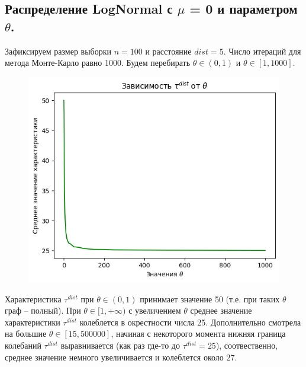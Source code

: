 \documentclass{report}
\begin{document}
\subsection{Распределение LogNormal с $\mu$ = 0 и параметром $\theta$.}
Зафиксируем размер выборки $n = 100$ и расстояние $dist = 5$. Число итераций для метода Монте-Карло равно 1000.
\newline
\newline
Будем перебирать $\theta \in (0, 1)$ и $\theta \in [1, 1000]$.
\newline
\newline
\begin{figure}[h]
    \centering
    \includegraphics[width=0.5\linewidth]{6.png}
\end{figure}
\newline
\newline
Характеристика $\tau^{dist}$ при $\theta \in (0, 1)$ принимает значение 50 (т.е. при таких $\theta$ граф -- полный). 
\newline
\newline
При $\theta \in [1, +\infty)$ с увеличением $\theta$ среднее значение характеристики $\tau^{dist}$ колеблется в окрестности числа 25.
\newline
\newline
Дополнительно смотрела на большие $\theta \in [15, 500000]$, начиная с некоторого момента нижняя граница колебаний $\tau^{dist}$ выравнивается (как раз где-то до $\tau^{dist} = 25$), соотвественно, среднее значение немного увеличивается и колеблется около 27.
\end{document}
